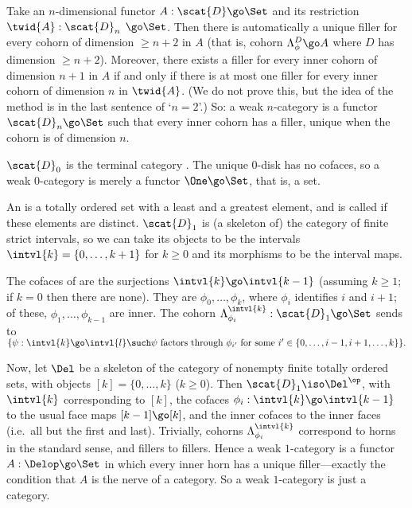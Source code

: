 Take an $n$-dimensional functor $A: \scat{D} \go \Set$ and its restriction
$\twid{A}: \scat{D}_n$ $\go \Set$.  Then there is automatically a unique
filler for every cohorn of dimension $\geq n+2$ in $A$ (that is, cohorn
$\Lambda^D_\phi \go A$ where $D$ has dimension $\geq n+2$).  Moreover, there
exists a filler for every inner cohorn of dimension $n+1$ in $A$ if and only
if there is at most one filler for every inner cohorn of dimension $n$ in
$\twid{A}$.  (We do not prove this, but the idea of the method is in the last
sentence of `$n=2$'.)  So: a weak $n$-category is a functor $\scat{D}_n \go
\Set$ such that every inner cohorn has a filler, unique when the cohorn is of
dimension $n$.




$\scat{D}_0$ is the terminal category \One.  The unique $0$-disk has no
cofaces, so a weak $0$-category is merely a functor $\One \go \Set$, that is,
a set.




An  is a totally ordered set with a least and a greatest
element, and is called  if these elements are distinct.
$\scat{D}_1$ is (a skeleton of) the category of finite strict intervals, so
we can take its objects to be the intervals $\intvl{k} = \{0, \ldots, k+1\} $
for $k\geq 0$ and its morphisms to be the interval maps.

The cofaces of  are the surjections $\intvl{k}\go\intvl{k-1}$
(assuming $k\geq 1$; if $k=0$ then there are none).  They are $\phi_0,
\ldots, \phi_k$, where $\phi_i$ identifies $i$ and $i+1$; of these, $\phi_1,
\ldots, \phi_{k-1}$ are inner.  The cohorn $\Lambda^{\intvl{k}}_{\phi_i}:
\scat{D}_1 \go \Set$ sends  to
$
\{ \psi: \intvl{k}\go\intvl{l} \such
\psi \textrm{ factors through }\phi_{i'} \textrm{ for some } 
i'\in\{0, \ldots, i-1, i+1, \ldots, k\} \}.
$

Now, let $\Del$ be a skeleton of the category of nonempty finite totally
ordered sets, with objects $[k] = \{0, \ldots, k\}$ ($k\geq 0$).  Then
$\scat{D}_1 \iso \Del^\op$, with $\intvl{k}$ corresponding to $[k]$, the
cofaces $\phi_i: \intvl{k}\go\intvl{k-1}$ to the usual face maps $[k-1] \go
[k]$, and the inner cofaces to the inner faces (i.e.\ all but the first and
last).  Trivially, cohorns $\Lambda^{\intvl{k}}_{\phi_i}$ correspond to horns
in the standard sense, and fillers to fillers.  Hence a weak $1$-category is
a functor $A: \Delop \go \Set$ in which every inner horn has a unique
filler---exactly the condition that $A$ is the nerve of a category.  So a
weak $1$-category is just a category.



